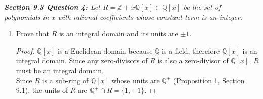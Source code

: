\documentclass{article}
\begin{document}
\it \textbf{Section 9.3 Question 4:} Let
  $R=\mathbb{Z}+x\mathbb{Q}[x]\subset\mathbb{Q}[x]$ be the set of
  polynomials in $x$ with rational coefficients whose constant term is an
  integer.

  \begin{enumerate}[label={(\alph*)}]
    \item Prove that $R$ is an integral domain and its units are $\pm1$.
      \begin{proof}
        $\mathbb{Q}[x]$ is a Euclidean domain because $\mathbb{Q}$ is a
        field, therefore $\mathbb{Q}[x]$ is an integral domain. Since any
        zero-divisors of $R$ is also a zero-divisor of $\mathbb{Q}[x]$, $R$
        must be an integral domain. \\

        Since $R$ is a sub-ring of $\mathbb{Q}[x]$ whose units are
        $\mathbb{Q}^+$ (Proposition 1, Section 9.1), the units of $R$ are
        $\mathbb{Q}^+\cap R=\{1,-1\}$.
      \end{proof}
  \end{enumerate}
\end{document}
